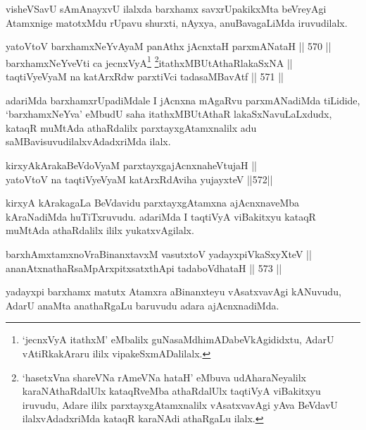 \begin{artha}
visheVSavU sAmAnayxvU ilalxda barxhamx savxrUpakikxMta beVreyAgi
Atamxnige matotxMdu rUpavu shurxti, nAyxya, anuBavagaLiMda\break
iruvudilalx.
\end{artha}

\begin{shl}
yatoV\s toV barxhamxNeYvAyaM panAthx jAcnxtaH parxmANataH \hfill || 570 ||  \\
barxhamxNeYveVti ca jecnxVyA\footnote{`jecnxVyA itathxM' eMbalilx guNasaMdhimADabeVkAgididxtu, AdarU vAtiRkakAraru ililx vipakeSxmADalilalx.} \footnote{`hasetxVna shareVNa rAmeVNa hataH' eMbuva udAharaNeyalilx karaNAthaRdalUlx kataqRveMba athaRdalUlx taqtiVyA viBakitxyu iruvudu, Adare ililx parxtayxgAtamxnalilx vAsatxvavAgi yAva BeVdavU ilalxvAdadxriMda kataqR karaNAdi athaRgaLu ilalx.}itathxMBUtAthaRlakaSxNA || \\
taqtiVyeVyaM na katArxRdw parxtiVci tadasaMBavAtf \hfill || 571 ||  
\end{shl}



\begin{artha}
adariMda barxhamxrUpadiMdale I jAcnxna mAgaRvu parxmANadiMda
tiLidide, `barxhamxNeYva' eMbudU saha itathxMBUtAthaR
lakaSxNavuLaLxdudx, kataqR muMtAda athaRdalilx parxtayxgAtamxnalilx
adu saMBavisuvudilalxvAdadxriMda ilalx.
\end{artha}


\begin{shl}
kirxyAkArakaBeVdoV\s yaM parxtayxgajAcnxnaheVtujaH || \\
yatoV\s toV na taqtiVyeVyaM katArxRdAviha yujayxteV \hfill ||572||  
\end{shl}

\begin{artha}
kirxyA kArakagaLa BeVdavidu parxtayxgAtamxna ajAcnxnaveMba kAraNadiMda
huTiTxruvudu. adariMda I taqtiVyA viBakitxyu kataqR muMtAda athaRdalilx
ililx yukatxvAgilalx.
\end{artha}

\begin{shl}
barxhAmxtamxnoVraBinanxtavxM vasutxtoV yadayxpiVkaSxyXteV || \\
ananAtxnathaRsaMpArxpitxsatxthA\s pi tadaboVdhataH \hfill || 573 ||   
\end{shl}

\begin{artha}
yadayxpi barxhamx matutx Atamxra aBinanxteyu vAsatxvavAgi kANuvudu,
AdarU anaMta anathaRgaLu baruvudu adara ajAcnxnadiMda.
\end{artha}

